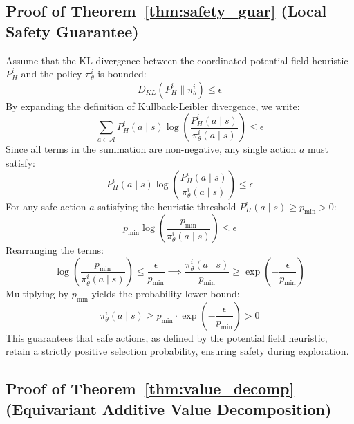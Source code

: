 \documentclass[11pt,a4paper]{article}
\begin{document}
\subsection{Proof of Theorem~\ref{thm:safety_guar} (Local Safety Guarantee)}\label{app:proof_safety_guar}
Assume that the KL divergence between the coordinated potential field heuristic $P_H^i$ and the policy $\pi_\theta^i$ is bounded:
\begin{equation}
    D_{KL}(P_H^i \parallel \pi_\theta^i) \leq \epsilon
\end{equation}
By expanding the definition of Kullback-Leibler divergence, we write:
\begin{equation}
    \sum_{a \in \mathcal{A}} P_H^i(a \mid s) \log\left(\frac{P_H^i(a \mid s)}{\pi_\theta^i(a \mid s)}\right) \leq \epsilon
\end{equation}
Since all terms in the summation are non-negative, any single action $a$ must satisfy:
\begin{equation}
    P_H^i(a \mid s) \log\left(\frac{P_H^i(a \mid s)}{\pi_\theta^i(a \mid s)}\right) \leq \epsilon
\end{equation}
For any safe action $a$ satisfying the heuristic threshold $P_H^i(a \mid s) \geq p_{\min} > 0$:
\begin{equation}
    p_{\min} \log\left(\frac{p_{\min}}{\pi_\theta^i(a \mid s)}\right) \leq \epsilon
\end{equation}
Rearranging the terms:
\begin{equation}
    \log\left(\frac{p_{\min}}{\pi_\theta^i(a \mid s)}\right) \leq \frac{\epsilon}{p_{\min}} \implies \frac{\pi_\theta^i(a \mid s)}{p_{\min}} \geq \exp\left(-\frac{\epsilon}{p_{\min}}\right)
\end{equation}
Multiplying by $p_{\min}$ yields the probability lower bound:
\begin{equation}
    \pi_\theta^i(a \mid s) \geq p_{\min} \cdot \exp\left(-\frac{\epsilon}{p_{\min}}\right) > 0
\end{equation}
This guarantees that safe actions, as defined by the potential field heuristic, retain a strictly positive selection probability, ensuring safety during exploration.

\subsection{Proof of Theorem~\ref{thm:value_decomp} (Equivariant Additive Value Decomposition)}\label{app:proof_value_decomp}
\end{document}
